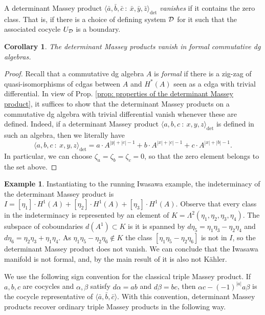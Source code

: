 \documentclass[11pt]{article}
\newtheorem{corollary}[theorem]{Corollary}
\theoremstyle{definition}
\newtheorem{example}[theorem]{Example}
\theoremstyle{definition}
\begin{document}
A determinant Massey product $\langle \bar a,\bar b,\bar c \ :\ \bar x, \bar y, \bar z\rangle_{\det}$ \emph{vanishes} if it contains the zero class. 
That is, if there is a choice of defining system $\mathcal D$ for it such that the associated cocycle $U_\mathcal D$ is a boundary.


\begin{corollary}
\label{cor: Massey products vanish in formal algebras}
The determinant Massey products vanish in formal commutative dg algebras.
\end{corollary}

\begin{proof}
Recall that a commutative dg algebra $A$ is \emph{formal}
if there is a zig-zag of quasi-isomorphisms of cdgas between $A$ and $H^*(A)$
seen as a cdga with trivial differential.
In view of Prop. \ref{prop: properties of the determinant Massey product},
it suffices to show that the determinant Massey products on a commutative dg algebra with trivial differential
vanish whenever these are defined. 
Indeed, if a determinant Massey product $\langle a,b,c\ : \ x,y,z\rangle_{\det}$
is defined in such an algebra, then we literally have
\begin{equation*}
\langle a,b,c\ : \ x,y,z\rangle_{\det} = a\cdot A^{|y|+|c|-1} + b\cdot A^{|x|+|c|-1} + c\cdot A^{|x|+|b|-1}.
\end{equation*}
In particular, we can choose $\zeta_a=\zeta_b=\zeta_c = 0$, so that the zero element belongs to the set above.
\end{proof}

\begin{example}
\label{exa: Iwasaba formal}
Instantiating to the running Iwasawa example,
the indeterminacy of the determinant Massey product is 
$I = [\eta_1] \cdot H^1(A) +[\eta_2] \cdot H^1(A) +[\eta_3] \cdot H^1(A)$.
Observe that every class in the indeterminacy is represented by an element of $K = \Lambda^2(\eta_1,\eta_2,\eta_3,\eta_4)$.
The subspace of coboundaries $d(A^1) \subset K$ is it is spanned by $d\eta_5 = \eta_1\eta_3- \eta_2\eta_4$ and $d\eta_6 = \eta_2\eta_3 +\eta_1\eta_4$.
As $\eta_1\eta_5-\eta_2\eta_6 \notin K$ the class $[\eta_1\eta_5-\eta_2\eta_6]$ is not in $I$, so the determinant Massey product does not vanish.
We can conclude that the Iwasawa manifold is not formal, and, by the main result of \cite{deligne75} it is also not K\"{a}hler.
\end{example}


We use the following sign convention for the classical triple Massey product. 
If $a,b,c$ are cocycles and $\alpha,\beta$ satisfy $d\alpha=ab$ and $d\beta=bc$,
then $\alpha c-(-1)^{|a|}a\beta$ is the cocycle representative of $\langle \bar a,\bar b,\bar c\rangle$.
With this convention, 
determinant Massey products recover ordinary triple Massey products in the following way.
\end{document}
